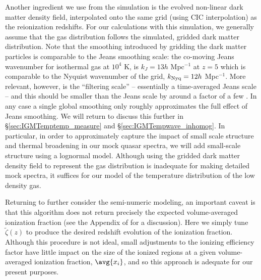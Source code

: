 Another ingredient we use from the \citet{McQuinn:2007dy} simulation is the evolved non-linear
dark matter density field, interpolated onto the same grid (using CIC interpolation) as the reionization redshifts. For our calculations with this simulation, we generally assume that
the gas distribution follows the simulated, gridded dark matter distribution. Note that the smoothing introduced by gridding the dark matter particles is
comparable to the Jeans smoothing scale:
the co-moving Jeans wavenumber for isothermal gas
at $10^4$ K, is $k_J = 13 h$ Mpc$^{-1}$ at $z=5$ which is comparable to the Nyquist wavenumber of the grid, $k_{\rm Nyq} = 12 h$ Mpc$^{-1}$.
More relevant, however, is the ``filtering scale'' -- essentially a time-averaged Jeans scale -- and this should be smaller than the Jeans scale by around a factor of a few \citep{Gnedin:1997td}. In any case a single global smoothing only roughly approximates the full effect of Jeans smoothing. We will return to discuss this further in \S \ref{sec:IGMTemptemp_measure} and \S \ref{sec:IGMTempwave_inhomog}. In particular, in order to approximately 
capture the impact of small scale structure and thermal broadening in our mock quasar spectra, we will add small-scale structure using a lognormal model. Although using the gridded dark matter density field to represent the gas distribution is inadequate for making detailed mock spectra, it suffices for our model of the temperature distribution of the low density gas.

Returning to further consider the semi-numeric modeling, an important caveat is that this algorithm does not return precisely the
expected volume-averaged ionization fraction (see the Appendix of \citealt{Zahn:2006sg} for a discussion). 
Here we simply tune $\tilde{\zeta}(z)$
to produce the desired redshift evolution of the ionization fraction. 
Although this procedure is not
ideal, small adjustments to the ionizing efficiency factor have little impact on 
the size of the ionized regions at a given volume-averaged ionization fraction, $\avg{x_i}$,
and so this approach is adequate for our present purposes.


